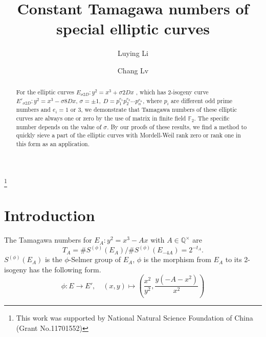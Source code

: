 \documentclass{amsart}
\numberwithin{equation}{section}
\theoremstyle{plain}
\theoremstyle{definition}
\newcommand{\FF}{\mathbb F}
\newcommand{\QQ}{\mathbb Q}
\begin{document}

\title{Constant Tamagawa numbers of special elliptic curves}
\author[L. Li]{Luying Li}
\address{State Key Laboratory of Information Security\\
Institute of Information Engineering\\
Chinese Academy of Sciences\\
Beijing 100093, P.R. China}

\author[C. Lv]{Chang Lv}
\address{State Key Laboratory of Information Security\\
Institute of Information Engineering\\
Chinese Academy of Sciences\\
Beijing 100093, P.R. China}

\thanks{This work was supported by National Natural Science Foundation of China (Grant No.11701552)}

\maketitle





\begin{abstract}
For the elliptic curves $E_{\sigma 2D} : y^2 = x^3 + \sigma 2Dx$ , which has 2-isogeny curve $E'_{\sigma 2D} : y^2 = x^3 -\sigma 8Dx$,  $\sigma = \pm 1,\ D = p_1^{e_1}p_2^{e_2}\cdots p_n^{e_n}$, where $p_i$ are different odd prime numbers and $e_i = 1 \text{ or } 3$, we demonstrate that Tamagawa numbers of these elliptic curves are always one or zero by the use of matrix in finite field $\FF_2$. The specific number depends on the value of $\sigma$. By our proofs of these results, we find a method to quickly sieve a part of the elliptic curves with Mordell-Weil rank zero or rank one in this form as an application.
\end{abstract}


\section{Introduction}
The Tamagawa numbers for $E_A: y^2 = x^3-A x$ with $A \in \QQ^\times$ are
$$T_{A} = \# S^{(\phi)}(E_A)/\# S^{(\phi)}(E_{-4A}) = 2^{-t_A}.$$ 
$S^{(\phi)}(E_A)$ is the $\phi$-Selmer group of $E_A$, $\phi$ is the morphism from $E_A$ to its 2-isogeny has the following form.
$$
\phi : E \rightarrow E', \quad (x,y)\mapsto (\frac{x^2}{y^2},\frac{y(-A-x^2)}{x^2})
$$
\end{document}

